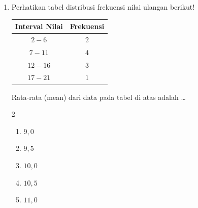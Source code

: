 \documentclass[12pt,a4paper]{article}
\begin{document}
\begin{enumerate}[itemsep=2ex]
    \item Perhatikan tabel distribusi frekuensi nilai ulangan berikut!\\
    \begin{center}
    \begin{tabular}{|c|c|}
    \hline
    \rowcolor{cyan!20}
    \textbf{Interval Nilai} & \textbf{Frekuensi} \\
    \hline
    $2 - 6$ & $2$ \\
    $7 - 11$ & $4$ \\
    $12 - 16$ & $3$ \\
    $17 - 21$ & $1$ \\
    \hline
    \end{tabular}
    \end{center}
    Rata-rata (mean) dari data pada tabel di atas adalah \dots
    \begin{multicols}{2}
    \begin{enumerate}[label=\Alph*.]
        \item $9,0$
        \item $9,5$
        \item $10,0$
        \item $10,5$
        \item $11,0$
    \end{enumerate}
    \end{multicols}


\end{enumerate}
\end{document}
